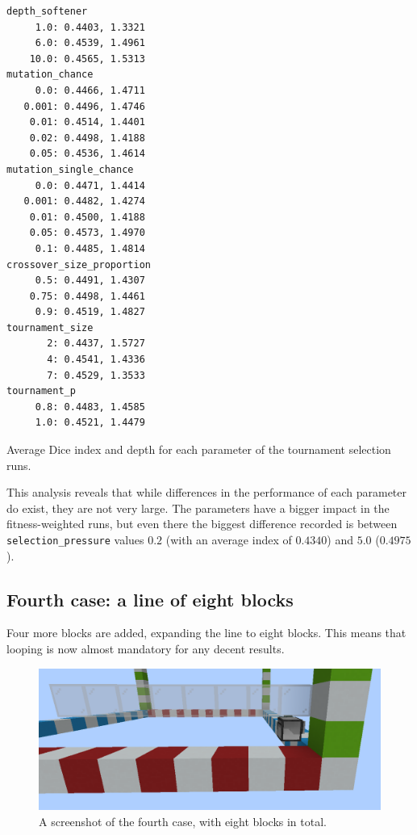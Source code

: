 \documentclass{report}
\newenvironment{code}{\captionsetup{type=listing}}{}
\begin{document}
\begin{code}
    \begin{verbatim}
depth_softener
     1.0: 0.4403, 1.3321
     6.0: 0.4539, 1.4961
    10.0: 0.4565, 1.5313
mutation_chance
     0.0: 0.4466, 1.4711
   0.001: 0.4496, 1.4746
    0.01: 0.4514, 1.4401
    0.02: 0.4498, 1.4188
    0.05: 0.4536, 1.4614
mutation_single_chance
     0.0: 0.4471, 1.4414
   0.001: 0.4482, 1.4274
    0.01: 0.4500, 1.4188
    0.05: 0.4573, 1.4970
     0.1: 0.4485, 1.4814
crossover_size_proportion
     0.5: 0.4491, 1.4307
    0.75: 0.4498, 1.4461
     0.9: 0.4519, 1.4827
tournament_size
       2: 0.4437, 1.5727
       4: 0.4541, 1.4336
       7: 0.4529, 1.3533
tournament_p
     0.8: 0.4483, 1.4585
     1.0: 0.4521, 1.4479
    \end{verbatim}
    \caption{Average Dice index and depth for each parameter of the tournament selection runs.}
    \label{lst:case3_tour}
\end{code}

This analysis reveals that while differences in the performance of each parameter do exist, they are not very large. The parameters have a bigger impact in the fitness-weighted runs, but even there the biggest difference recorded is between \verb|selection_pressure| values $0.2$ (with an average index of $0.4340$) and $5.0$ ($0.4975$).

\subsection{Fourth case: a line of eight blocks}

Four more blocks are added, expanding the line to eight blocks. This means that looping is now almost mandatory for any decent results.

\begin{figure}[H]
    \centering
    \includegraphics[scale=0.3]{minecraft5}
    \caption{A screenshot of the fourth case, with eight blocks in total.}
\end{figure}
\end{document}
